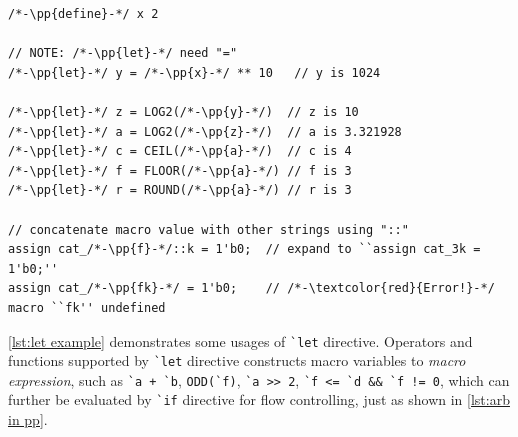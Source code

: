 \begin{lstlisting}[caption={\texttt{\`{}let} usage examples}, label={lst:let example}]
/*-\pp{define}-*/ x 2

// NOTE: /*-\pp{let}-*/ need "="
/*-\pp{let}-*/ y = /*-\pp{x}-*/ ** 10   // y is 1024

/*-\pp{let}-*/ z = LOG2(/*-\pp{y}-*/)  // z is 10
/*-\pp{let}-*/ a = LOG2(/*-\pp{z}-*/)  // a is 3.321928
/*-\pp{let}-*/ c = CEIL(/*-\pp{a}-*/)  // c is 4
/*-\pp{let}-*/ f = FLOOR(/*-\pp{a}-*/) // f is 3
/*-\pp{let}-*/ r = ROUND(/*-\pp{a}-*/) // r is 3

// concatenate macro value with other strings using "::"
assign cat_/*-\pp{f}-*/::k = 1'b0;  // expand to ``assign cat_3k = 1'b0;''
assign cat_/*-\pp{fk}-*/ = 1'b0;    // /*-\textcolor{red}{Error!}-*/ macro ``fk'' undefined
\end{lstlisting}
\autoref{lst:let example} demonstrates some usages of \texttt{\`{}let} directive.
Operators and functions supported by \texttt{\`{}let} directive constructs macro variables
to \emph{macro expression}, such as
\texttt{\`{}a + \`{}b},
\texttt{ODD(\`{}f)},
\texttt{\`{}a >> 2},
\texttt{\`{}f <= \`{}d \&\& \`{}f != 0},
which can further be evaluated by \texttt{\`{}if} directive for flow controlling,
just as shown in \autoref{lst:arb in pp}.
